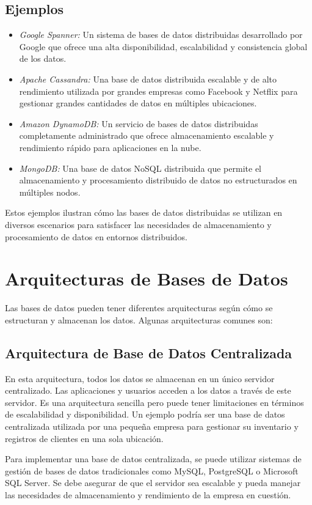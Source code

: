 \subsection{Ejemplos}
\noindent
\begin{itemize}
	\item \textit{Google Spanner:} Un sistema de bases de datos distribuidas desarrollado por Google que ofrece una alta disponibilidad, escalabilidad y consistencia global de los datos.
	\item \textit{Apache Cassandra:} Una base de datos distribuida escalable y de alto rendimiento utilizada por grandes empresas como Facebook y Netflix para gestionar grandes cantidades de datos en múltiples ubicaciones.
	\item \textit{Amazon DynamoDB:} Un servicio de bases de datos distribuidas completamente administrado que ofrece almacenamiento escalable y rendimiento rápido para aplicaciones en la nube.
	\item \textit{MongoDB:} Una base de datos NoSQL distribuida que permite el almacenamiento y procesamiento distribuido de datos no estructurados en múltiples nodos.
\end{itemize}
Estos ejemplos ilustran cómo las bases de datos distribuidas se utilizan en diversos escenarios para satisfacer las necesidades de almacenamiento y procesamiento de datos en entornos distribuidos.

\section{Arquitecturas de Bases de Datos}
\noindent
Las bases de datos pueden tener diferentes arquitecturas según cómo se estructuran y almacenan los datos. Algunas arquitecturas comunes son:

\subsection{Arquitectura de Base de Datos Centralizada}
\noindent
En esta arquitectura, todos los datos se almacenan en un único servidor centralizado. Las aplicaciones y usuarios acceden a los datos a través de este servidor. Es una arquitectura sencilla pero puede tener limitaciones en términos de escalabilidad y disponibilidad. Un ejemplo podría ser una base de datos centralizada utilizada por una pequeña empresa para gestionar su inventario y registros de clientes en una sola ubicación.

Para implementar una base de datos centralizada, se puede utilizar sistemas de gestión de bases de datos tradicionales como MySQL, PostgreSQL o Microsoft SQL Server. Se debe asegurar de que el servidor sea escalable y pueda manejar las necesidades de almacenamiento y rendimiento de la empresa en cuestión.

